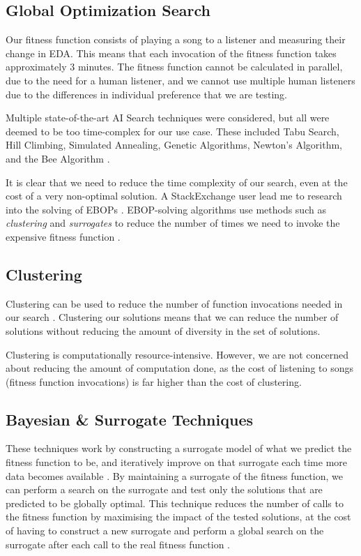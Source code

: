\documentclass{article}
\begin{document}
	\subsection{Global Optimization Search}
	Our fitness function consists of playing a song to a listener and measuring their change in EDA. This means that each invocation of the fitness function takes approximately 3 minutes. The fitness function cannot be calculated in parallel, due to the need for a human listener, and we cannot use multiple human listeners due to the differences in individual preference that we are testing.
	
	Multiple state-of-the-art AI Search techniques were considered, but all were deemed to be too time-complex for our use case. These included Tabu Search, Hill Climbing, Simulated Annealing, Genetic Algorithms, Newton's Algorithm, and the Bee Algorithm \cite{chandel_searching_2014, pham_bee_2005}.
	
	It is clear that we need to reduce the time complexity of our search, even at the cost of a very non-optimal solution. A StackExchange user lead me to research into the solving of EBOPs \cite{stackexchange_search_2018}. EBOP-solving algorithms use methods such as \emph{clustering} and \emph{surrogates} to reduce the number of times we need to invoke the expensive fitness function \cite{boukouvala_derivative-free_2014, jones_efficient_1998, dong_surrogate-based_2018}.
	
	\subsection{Clustering}
	Clustering can be used to reduce the number of function invocations needed in our search \cite{boukouvala_derivative-free_2014, wang_time_2017}. Clustering our solutions means that we can reduce the number of solutions without reducing the amount of diversity in the set of solutions.
	
	Clustering is computationally resource-intensive. However, we are not concerned about reducing the amount of computation done, as the cost of listening to songs (fitness function invocations) is far higher than the cost of clustering.
	
	\subsection{Bayesian \& Surrogate Techniques}
	These techniques work by constructing a surrogate model of what we predict the fitness function to be, and iteratively improve on that surrogate each time more data becomes available \cite{mockus_optimization_nodate, dong_surrogate-based_2018}. By maintaining a surrogate of the fitness function, we can perform a search on the surrogate and test only the solutions that are predicted to be globally optimal. This technique reduces the number of calls to the fitness function by maximising the impact of the tested solutions, at the cost of having to construct a new surrogate and perform a global search on the surrogate after each call to the real fitness function \cite{boukouvala_derivative-free_2014}.
	
\end{document}
